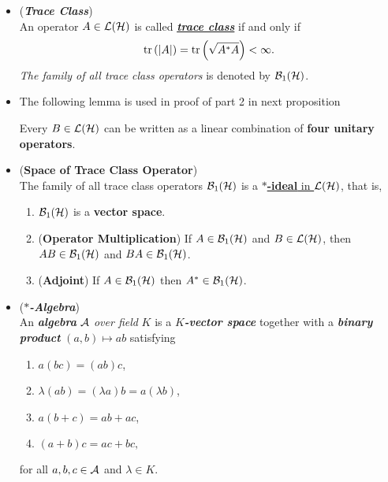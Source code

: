 \documentclass[11pt]{article}
\begin{document}
\begin{itemize}
\item \begin{definition} (\emph{\textbf{Trace Class}})\\
An operator $A \in {\mathcal L}({\mathcal H})$ is called \underline{\emph{\textbf{trace class}}} if and only if 
\begin{align*}
\mathrm{tr}\left(\left\lvert A \right\rvert \right) = \mathrm{tr}\left(\sqrt{A^{*}A} \right) < \infty.
\end{align*}
\emph{The family of all trace class operators} is denoted by ${\mathcal B}_1({\mathcal H})$.
\end{definition}

\item The following lemma is used in proof of part 2 in next proposition
 \begin{lemma}
Every $B \in {\mathcal L}({\mathcal H})$ can be written as a linear combination of \textbf{four unitary operators}. 
\end{lemma}

\item \begin{proposition} (\textbf{Space of Trace Class Operator}) \citep{reed1980methods} \\
The family of all trace class operators ${\mathcal B}_1({\mathcal H})$ is a \underline{\textbf{$*$-ideal} in ${\mathcal L}({\mathcal H})$}, that is, 
\begin{enumerate}
\item ${\mathcal B}_1({\mathcal H})$  is a \textbf{vector space}. 
\item (\textbf{Operator Multiplication}) If $A \in {\mathcal B}_1({\mathcal H})$ and $B \in {\mathcal L}({\mathcal H})$, then $AB \in {\mathcal B}_1({\mathcal H})$ and $BA \in {\mathcal B}_1({\mathcal H})$.
\item (\textbf{Adjoint}) If $A \in {\mathcal B}_1({\mathcal H})$ then $A^{*} \in {\mathcal B}_1({\mathcal H})$. 
\end{enumerate}
\end{proposition}

\item \begin{remark} 
\begin{definition} (\emph{\textbf{$*$-Algebra}})\\
An  \emph{\textbf{algebra}} ${\mathcal A}$ \emph{over field} $K$ is a \emph{\textbf{$K$-vector space}} together with a \emph{\textbf{binary product}} $(a,b)\mapsto ab$ satisfying
\begin{enumerate}
\item $a(bc)=(ab)c$,
\item $\lambda(ab)=(\lambda a)b=a(\lambda b)$,
\item $a(b+c)=ab+ac$,
\item $(a+b)c=ac+bc,$
\end{enumerate}
for all $a,b,c\in {\mathcal A}$ and $\lambda\in K$.


\end{definition}
\end{remark}
\end{itemize}
\end{document}
